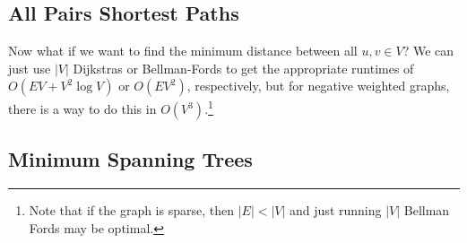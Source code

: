 \subsection{All Pairs Shortest Paths} 

  Now what if we want to find the minimum distance between all $u, v \in V$? We can just use $|V|$ Dijkstras or Bellman-Fords to get the appropriate runtimes of $O(EV + V^2 \log{V})$ or $O(EV^2)$, respectively, but for negative weighted graphs, there is a way to do this in $O(V^3)$.\footnote{Note that if the graph is sparse, then $|E| < |V|$ and just running $|V|$ Bellman Fords may be optimal.}

\subsection{Minimum Spanning Trees} 

